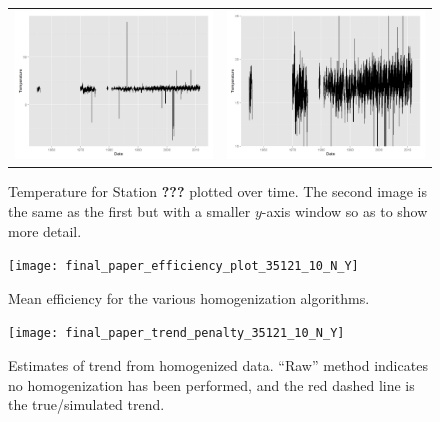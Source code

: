 \documentclass[12pt]{article}
\begin{document}
\clearpage








\begin{figure}[h!]
	\centering
	\begin{tabular}{cc}
		\includegraphics[width=.5\textwidth]{Temperature_data_from_mandy_outliers} &
		\includegraphics[width=.5\textwidth]{Temperature_data_from_mandy_changepoints}
	\end{tabular}
	\caption{Temperature for Station \textbf{???} plotted over time.  The second image is the same as the first but with a smaller $y$-axis window so as to show more detail.}
	\label{fig:BasicTS}
\end{figure}

\begin{figure}[h!]
	\centering
	\texttt{[image: final\_paper\_efficiency\_plot\_35121\_10\_N\_Y]}
	\caption{Mean efficiency for the various homogenization algorithms.}
	\label{fig:hom_Efficiency}
\end{figure}

\begin{figure}[h!]
	\centering
	\texttt{[image: final\_paper\_trend\_penalty\_35121\_10\_N\_Y]}
	\caption{Estimates of trend from homogenized data.  ``Raw'' method indicates no homogenization has been performed, and the red dashed line is the true/simulated trend.}
	\label{fig:hom_Trend}
\end{figure}
\end{document}
